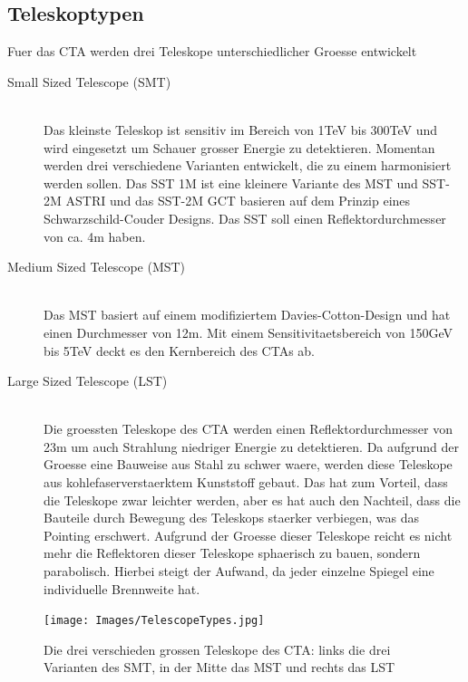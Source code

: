 \subsection{Teleskoptypen}
Fuer das CTA werden drei Teleskope unterschiedlicher Groesse entwickelt
\begin{description}
\item[Small Sized Telescope (SMT)]\hfill \\
Das kleinste Teleskop ist sensitiv im Bereich von 1TeV bis 300TeV und wird eingesetzt um Schauer grosser Energie zu detektieren. Momentan werden drei verschiedene Varianten entwickelt, die zu einem harmonisiert werden sollen. Das SST 1M ist eine kleinere Variante des MST und SST-2M  ASTRI und das SST-2M GCT basieren auf dem Prinzip eines Schwarzschild-Couder Designs. Das SST soll einen Reflektordurchmesser von ca. 4m haben.
\item[Medium Sized Telescope (MST)]\hfill \\ 
Das MST basiert auf einem modifiziertem Davies-Cotton-Design und hat einen Durchmesser von 12m. Mit einem Sensitivitaetsbereich von 150GeV bis 5TeV deckt es den Kernbereich des CTAs ab.
\item[Large Sized Telescope (LST)]\hfill \\
Die groessten Teleskope des CTA werden einen Reflektordurchmesser von 23m um auch Strahlung niedriger Energie zu detektieren. Da aufgrund der Groesse eine Bauweise aus Stahl zu schwer waere, werden diese Teleskope aus kohlefaserverstaerktem Kunststoff gebaut. Das hat zum Vorteil, dass die Teleskope zwar leichter werden, aber es hat auch den Nachteil, dass die Bauteile durch Bewegung des Teleskops staerker verbiegen, was das Pointing erschwert. Aufgrund der Groesse dieser Teleskope reicht es nicht mehr die Reflektoren dieser Teleskope sphaerisch zu bauen, sondern parabolisch. Hierbei steigt der Aufwand, da jeder einzelne Spiegel eine individuelle Brennweite hat.
\end{description}
\begin{figure}[htbp]
\centering
\texttt{[image: Images/TelescopeTypes.jpg]}
\caption{Die drei verschieden grossen Teleskope des CTA: links die drei Varianten des SMT, in der Mitte das MST und rechts das LST}
\label{img:TelescopeTypes}
\end{figure}

